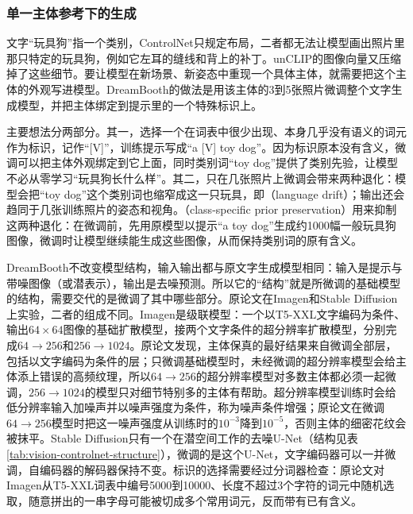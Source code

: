 \subsubsection{单一主体参考下的生成}
\label{sec:vision-generation-dreambooth}

文字“玩具狗”指一个类别，ControlNet只规定布局，二者都无法让模型画出照片里那只特定的玩具狗，例如它左耳的缝线和背上的补丁。unCLIP的图像向量又压缩掉了这些细节。要让模型在新场景、新姿态中重现一个具体主体，就需要把这个主体的外观写进模型。DreamBooth的做法是用该主体的3到5张照片微调整个文字生成模型，并把主体绑定到提示里的一个特殊标识上。

主要想法分两部分。其一，选择一个在词表中很少出现、本身几乎没有语义的词元作为标识，记作“[V]”，训练提示写成“a [V] toy dog”。因为标识原本没有含义，微调可以把主体外观绑定到它上面，同时类别词“toy dog”提供了类别先验，让模型不必从零学习“玩具狗长什么样”。其二，只在几张照片上微调会带来两种退化：模型会把“toy dog”这个类别词也缩窄成这一只玩具，即（language drift）；输出还会趋同于几张训练照片的姿态和视角。（class-specific prior preservation）用来抑制这两种退化：在微调前，先用原模型以提示“a toy dog”生成约1000幅一般玩具狗图像，微调时让模型继续能生成这些图像，从而保持类别词的原有含义。

DreamBooth不改变模型结构，输入输出都与原文字生成模型相同：输入是提示与带噪图像（或潜表示），输出是去噪预测。所以它的“结构”就是所微调的基础模型的结构，需要交代的是微调了其中哪些部分。原论文在Imagen和Stable Diffusion上实验，二者的组成不同。Imagen是级联模型：一个以T5-XXL文字编码为条件、输出$64\times64$图像的基础扩散模型，接两个文字条件的超分辨率扩散模型，分别完成$64\to256$和$256\to1024$。原论文发现，主体保真的最好结果来自微调全部层，包括以文字编码为条件的层；只微调基础模型时，未经微调的超分辨率模型会给主体添上错误的高频纹理，所以$64\to256$的超分辨率模型对多数主体都必须一起微调，$256\to1024$的模型只对细节特别多的主体有帮助。超分辨率模型训练时会给低分辨率输入加噪声并以噪声强度为条件，称为噪声条件增强；原论文在微调$64\to256$模型时把这一噪声强度从训练时的$10^{-3}$降到$10^{-5}$，否则主体的细密花纹会被抹平。Stable Diffusion只有一个在潜空间工作的去噪U-Net（结构见表\ref{tab:vision-controlnet-structure}），微调的是这个U-Net，文字编码器可以一并微调，自编码器的解码器保持不变。标识的选择需要经过分词器检查：原论文对Imagen从T5-XXL词表中编号5000到10000、长度不超过3个字符的词元中随机选取，随意拼出的一串字母可能被切成多个常用词元，反而带有已有含义。

